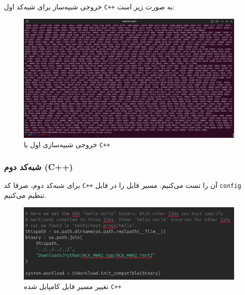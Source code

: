 \documentclass[12pt]{exam}
\begin{document}
\begin{multicols}{1}
	  خروجی شبیه‌ساز برای شبه‌کد اول \texttt{C++} به صورت زیر است:
	  \begin{center}
	  	\begin{figure}[H]
	  		\includegraphics[scale=0.12]{images/img4.png}
	  		\caption{خروجی شبیه‌سازی اول با \texttt{C++}}
	  		\label{خروجی شبیه‌سازی اول با cpp}
	  	\end{figure}
	  \end{center}
	  
	  
	  
	  \subsubsection{شبه‌کد دوم (C++)}
	  برای شبه‌کد دوم، صرفا کد \texttt{‌C++} آن را تست می‌کنیم. مسیر فایل را در فایل ‌\texttt{config} تنظیم می‌کنیم.
	  
	  \begin{center}
	  	\begin{figure}[H]
	  		\includegraphics[scale=0.29]{images/img5.png}
	  		\caption{تغییر مسیر فایل کامپایل شده \texttt{C++}}
	  		\label{تغییر مسیر فایل کامپایل شده cpp شبه‌کد دوم}
	  	\end{figure}
	  \end{center}
	  

\end{multicols}
\end{document}
